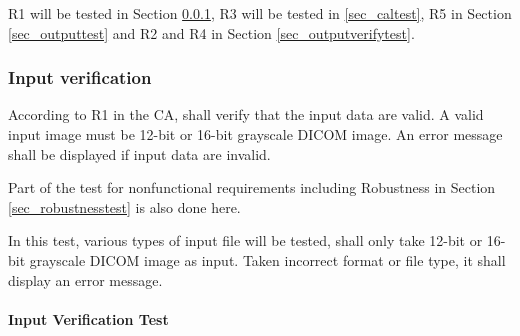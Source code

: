 \documentclass[12pt, titlepage]{article}
\begin{document}
R1 will be tested in Section \ref{sec_inputtest}, R3 will be tested in
\ref{sec_caltest}, R5 in Section \ref{sec_outputtest} and R2 and R4 in Section
\ref{sec_outputverifytest}.

\subsubsection{Input verification}
\label{sec_inputtest}

According to R1 in the CA, \progname{} shall verify that the input data are
valid. A valid input image must be 12-bit or 16-bit grayscale DICOM image. An
error message shall be displayed if input data are invalid.

Part of the test for nonfunctional requirements including Robustness in Section
\ref{sec_robustnesstest} is also done here.

In this test, various types of input file will be tested, \progname{} shall only
take 12-bit or 16-bit grayscale DICOM image as input. Taken incorrect format or
file type, it shall display an error message.
		
\paragraph{Input Verification Test}
\end{document}
